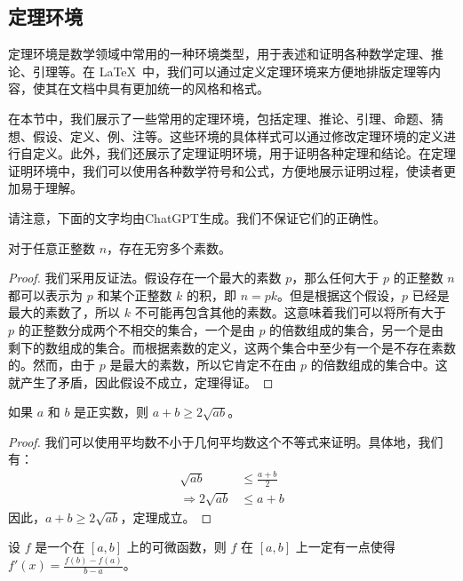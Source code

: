 \subsection{定理环境}

定理环境是数学领域中常用的一种环境类型，用于表述和证明各种数学定理、推论、引理等。在 \LaTeX\ 中，我们可以通过定义定理环境来方便地排版定理等内容，使其在文档中具有更加统一的风格和格式。

在本节中，我们展示了一些常用的定理环境，包括定理、推论、引理、命题、猜想、假设、定义、例、注等。这些环境的具体样式可以通过修改定理环境的定义进行自定义。此外，我们还展示了定理证明环境，用于证明各种定理和结论。在定理证明环境中，我们可以使用各种数学符号和公式，方便地展示证明过程，使读者更加易于理解。

请注意，下面的文字均由ChatGPT生成。我们不保证它们的正确性。

\begin{thm}
对于任意正整数 $n$，存在无穷多个素数。
\end{thm}

\begin{proof}
我们采用反证法。假设存在一个最大的素数 $p$，那么任何大于 $p$ 的正整数 $n$ 都可以表示为 $p$ 和某个正整数 $k$ 的积，即 $n = pk$。但是根据这个假设，$p$ 已经是最大的素数了，所以 $k$ 不可能再包含其他的素数。这意味着我们可以将所有大于 $p$ 的正整数分成两个不相交的集合，一个是由 $p$ 的倍数组成的集合，另一个是由剩下的数组成的集合。而根据素数的定义，这两个集合中至少有一个是不存在素数的。然而，由于 $p$ 是最大的素数，所以它肯定不在由 $p$ 的倍数组成的集合中。这就产生了矛盾，因此假设不成立，定理得证。
\end{proof}

\begin{cor}
如果 $a$ 和 $b$ 是正实数，则 $a+b \geq 2\sqrt{ab}$。
\end{cor}

\begin{proof}
我们可以使用平均数不小于几何平均数这个不等式来证明。具体地，我们有：
\begin{align*}
\sqrt{ab} &\leq \frac{a+b}{2} \\
\Rightarrow 2\sqrt{ab} &\leq a+b
\end{align*}
因此，$a+b \geq 2\sqrt{ab}$，定理成立。
\end{proof}

\begin{lem}
设 $f$ 是一个在 $[a,b]$ 上的可微函数，则 $f$ 在 $[a,b]$ 上一定有一点使得 $f'(x) = \frac{f(b)-f(a)}{b-a}$。
\end{lem}

